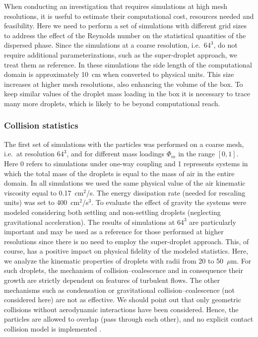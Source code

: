 \documentclass[../thesis.tex]{subfiles}
\begin{document}
When conducting an investigation that requires simulations at high mesh resolutions, it is useful to estimate their computational cost, resources needed and feasibility. Here we need to perform a set of simulations with different grid sizes to address the effect of the Reynolds number on the statistical quantities of the dispersed phase. Since the simulations at a coarse resolution, i.e.\ $64^3$, do not require additional parameterizations, such as the super-droplet approach, we treat them as reference. In these simulations the side length of the computational domain is approximately 10~cm when converted to physical units. This size increases at higher mesh resolutions, also enhancing the volume of the box. To keep similar values of the droplet mass loading in the box it is necessary to trace many more droplets, which is likely to be beyond computational reach.

\subsubsection{Collision statistics}

The first set of simulations with the particles was performed on a coarse mesh, i.e.\ at resolution $64^3$, and for different mass loadings $\Phi_m$ in the range $[0, 1]$. Here 0 refers to simulations under one-way coupling and 1 represents systems in which the total mass of the droplets is equal to the mass of air in the entire domain. In all simulations we used the same physical value of the air kinematic viscosity equal to 0.17~cm$^2$/s. The energy dissipation rate (needed for rescaling units) was set to 400~cm$^2$/s$^3$. To evaluate the effect of gravity the systems were modeled considering both settling and non-settling droplets (neglecting gravitational acceleration). The results of simulations at $64^3$ are particularly important and may be used as a reference for those performed at higher resolutions since there is no need to employ the super-droplet approach. This, of course, has a positive impact on physical fidelity of the modeled statistics. Here, we analyze the kinematic properties of droplets with radii from 20 to 50~$\mu$m. For such droplets, the mechanism of collision--coalescence and in consequence their growth are strictly dependent on features of turbulent flows. The other mechanisms such as condensation or gravitational collision--coalescence (not considered here) are not as effective. We should point out that only geometric collisions without aerodynamic interactions have been considered. Hence, the particles are allowed to overlap (pass through each other), and no explicit contact collision model is implemented \citep[unlike][which relocate one particle after collisions]{ARPW21}.
\end{document}
